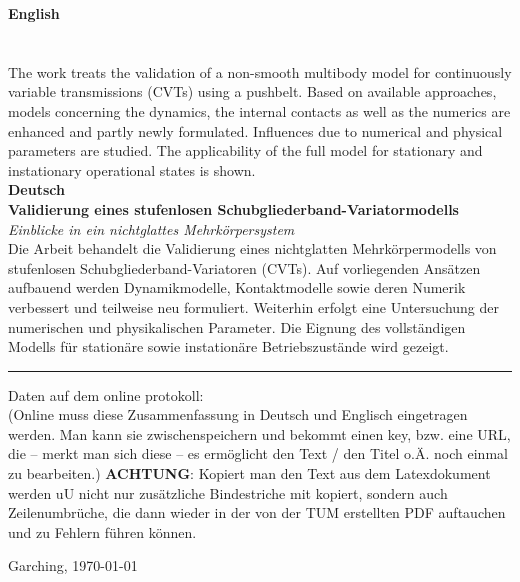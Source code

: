 \textbf{\large English}\\[1em]
\textbf{\DissTitle}\\
\emph{\DissSubTitle}\\[1em]
The work treats the validation of a non-smooth multibody model for continuously variable transmissions (CVTs) using a pushbelt.
Based on available approaches, models concerning the dynamics, the internal contacts as well as the numerics are enhanced and partly newly formulated.
Influences due to numerical and physical parameters are studied.
The applicability of the full model for stationary and instationary operational states is shown.\\[2em]

\textbf{\large Deutsch}\\[1em]
\textbf{Validierung eines stufenlosen Schubgliederband-Variatormodells}\\
\emph{Einblicke in ein nichtglattes Mehrkörpersystem}\\[1em]
Die Arbeit behandelt die Validierung eines nichtglatten Mehrkörpermodells von stufenlosen Schub\-gliederband-Variatoren (CVTs).
Auf vorliegenden Ansätzen aufbauend werden Dynamikmodelle, Kontaktmodelle sowie deren Numerik verbessert und teilweise neu formuliert.
Weiterhin erfolgt eine Untersuchung der numerischen und physikalischen Parameter.
Die Eignung des vollständigen Modells für stationäre sowie instationäre Betriebszustände wird gezeigt.\\\hrule
\vspace{2cm}

Daten auf dem online protokoll:\\
(Online muss diese Zusammenfassung in Deutsch und Englisch eingetragen werden. Man kann sie zwischenspeichern und bekommt einen key, bzw. eine URL, die -- merkt man sich diese -- es ermöglicht den Text / den Titel o.Ä. noch einmal zu bearbeiten.)
\textbf{ACHTUNG}: Kopiert man den Text aus dem Latexdokument werden uU nicht nur zusätzliche Bindestriche mit kopiert, sondern auch Zeilenumbrüche, die dann wieder in der von der TUM erstellten PDF auftauchen und zu Fehlern führen können. 

\vspace{3em}
 \hfill \raisebox{-1em}{$\overline{\makebox[0.45\textwidth]{\centering\footnotesize(\ProfUlbrich)}}$}

\printbibliography[title=Vorveröffentlichungen]
\nocite{*}
\vspace{3em}
  Garching, \today\hfill%
\vfill
\thispagestyle{empty}
\pagebreak

